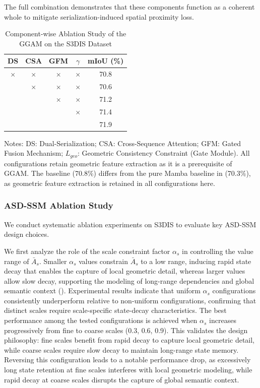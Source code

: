 \documentclass[a4paper,fleqn]{cas-sc}
\begin{document}
The full combination demonstrates that these components function as a coherent whole to mitigate serialization-induced spatial proximity loss.

\begin{table}[!t]
	\centering
	\caption{Component-wise Ablation Study of the GGAM on the S3DIS Dataset}
	\label{tab:ggam_components}
	\begin{tabular}{ccccc}
		\toprule
		\textbf{DS} & \textbf{CSA} & \textbf{GFM} & \textbf{$\gamma$} & \textbf{mIoU (\%)} \\
		\midrule
		$\times$ & $\times$ & $\times$ & $\times$ & 70.8 \\
		\checkmark & $\times$ & $\times$ & $\times$ & 70.6 \\
		\checkmark & \checkmark & $\times$ & $\times$ & 71.2 \\
		\checkmark & \checkmark & \checkmark & $\times$ & 71.4 \\
		\checkmark & \checkmark & \checkmark & \checkmark & 71.9 \\
		\bottomrule
	\end{tabular}
	\par\vspace{3pt}
	\footnotesize Notes: DS: Dual-Serialization; CSA: Cross-Sequence Attention; GFM: Gated Fusion Mechanism; $L_{geo}$: Geometric Consistency Constraint (Gate Module). All configurations retain geometric feature extraction as it is a prerequisite of GGAM. The baseline (70.8\%) differs from the pure Mamba baseline in  (70.3\%), as geometric feature extraction is retained in all configurations here.
\end{table}

\subsubsection{ASD-SSM Ablation Study}

We conduct systematic ablation experiments on S3DIS to evaluate key ASD-SSM design choices.

We first analyze the role of the scale constraint factor $\alpha_s$ in controlling the value range of $\bar{A}_s$. Smaller $\alpha_s$ values constrain $\bar{A}_s$ to a low range, inducing rapid state decay that enables the capture of local geometric detail, whereas larger values allow slow decay, supporting the modeling of long-range dependencies and global semantic context ().
Experimental results indicate that uniform $\alpha_s$ configurations consistently underperform relative to non-uniform configurations, confirming that distinct scales require scale-specific state-decay characteristics. The best performance among the tested configurations is achieved when $\alpha_s$ increases progressively from fine to coarse scales (0.3, 0.6, 0.9). This validates the design philosophy: fine scales benefit from rapid decay to capture local geometric detail, while coarse scales require slow decay to maintain long-range state memory. Reversing this configuration leads to a notable performance drop, as excessively long state retention at fine scales interferes with local geometric modeling, while rapid decay at coarse scales disrupts the capture of global semantic context.
\end{document}
